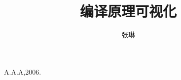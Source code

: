 \documentclass{article}
\title{编译原理可视化}
\author{张琳}
\begin{document}
\maketitle

\tableofcontents









\begin{thebibliography}{0}
A.A.A,2006.
\end{thebibliography}
\end{document}
